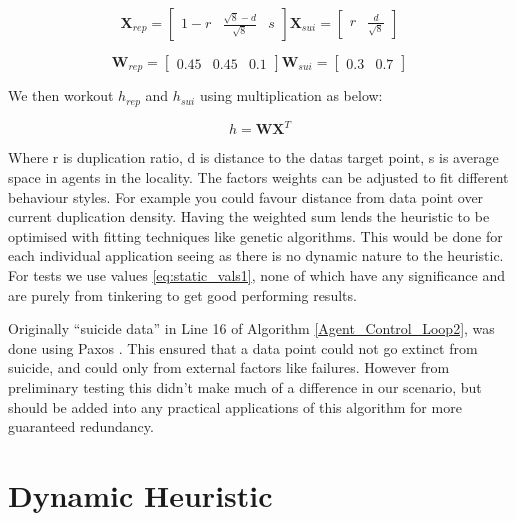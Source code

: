 \documentclass{UoYCSproject}
\begin{document}
\begin{equation}
\label{eq:static_vals2}
\textbf{X}_{rep}  = \begin{bmatrix}1-r &  \frac{\sqrt{8}-d}{\sqrt{8}} & s \end{bmatrix}
\textbf{X}_{sui}  =  \begin{bmatrix} r & \frac{d}{\sqrt{8}}\end{bmatrix} 
\end{equation}

\begin{equation}
\label{eq:static_vals1}
\textbf{W}_{rep}  = \begin{bmatrix}0.45 & 0.45 & 0.1\end{bmatrix}
\textbf{W}_{sui}  =  \begin{bmatrix}0.3 & 0.7 \end{bmatrix} 
\end{equation}

We then workout $h_{rep}$ and $h_{sui}$ using multiplication as below:

\begin{equation}
\label{eq:10}
h = \textbf{W} \textbf{X} ^{T}
\end{equation}

Where r is duplication ratio, d is distance to the datas target point, s is average space in agents in the locality.
The factors weights can be adjusted to fit different behaviour styles. 
For example you could favour distance from data point over current duplication density. 
Having the weighted sum lends the heuristic to be optimised with fitting techniques like genetic algorithms. 
This would be done for each individual application seeing as there is no dynamic nature to the heuristic.
For tests we use values \ref{eq:static_vals1},  none of which have any significance and are purely from tinkering to get good performing results.

Originally “suicide data” in Line 16 of Algorithm \ref{Agent_Control_Loop2}, was done using Paxos \cite{Paxos}.
This ensured that a data point could not go extinct from suicide, and could only from external factors like failures.
However from preliminary testing this didn’t make much of a difference in our scenario, but should be added into any practical applications of this algorithm for more guaranteed redundancy.

\section{Dynamic Heuristic}
\label{sec:Simple3}
\end{document}
